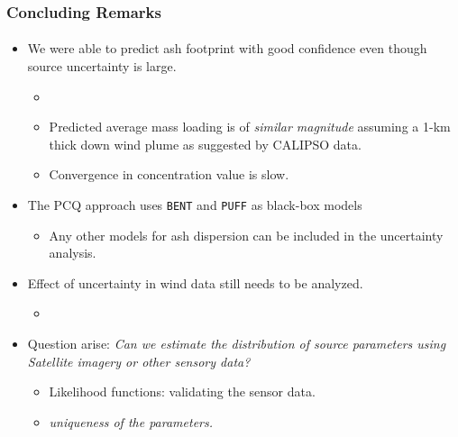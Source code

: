\documentclass{beamer}
\begin{document}
\begin{frame}\frametitle{Concluding Remarks}\framesubtitle{\color{white}{What needs to be done}}
\transboxin
\begin{itemize}
\item<1->  We were able to predict ash footprint with good confidence even though source uncertainty is large.
\begin{itemize}
\item<1-> {}
\item<1-> Predicted average mass loading is of \textit{similar magnitude} assuming a 1-km thick down wind plume as suggested by CALIPSO data.
\item<1-> \alert{Convergence in concentration value is slow.}
\end{itemize}
\item<2-> The PCQ approach uses \texttt{BENT} and \texttt{PUFF} as black-box models
\begin{itemize}
\item<2->  \alert{Any other models} for ash dispersion can be included in the uncertainty analysis.
\end{itemize}
\item<3-> Effect of uncertainty in wind data still needs to be analyzed.
\begin{itemize}
\item<3->{\color{blue}{Uncertainty Marriage}}
\end{itemize}
\item<4->  \alert{Question arise:} \textit{Can we estimate the distribution of source parameters using Satellite imagery or other sensory data? }
\begin{itemize}
\item<4-> \alert{Likelihood functions:} validating the sensor data.
\item<4-> \textit{uniqueness of the parameters.}
\end{itemize}
\end{itemize}
\end{frame}
\end{document}
